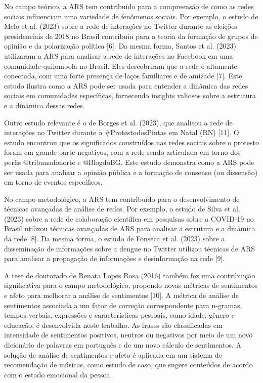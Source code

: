 No campo teórico, a ARS tem contribuído para a compreensão de como as redes sociais influenciam uma variedade de fenômenos sociais. Por exemplo, o estudo de Melo et al. (2023) sobre a rede de interações no Twitter durante as eleições presidenciais de 2018 no Brasil contribuiu para a teoria da formação de grupos de opinião e da polarização política [6]. Da mesma forma, Santos et al. (2023) utilizaram a ARS para analisar a rede de interações no Facebook em uma comunidade quilombola no Brasil. Eles descobriram que a rede é altamente conectada, com uma forte presença de laços familiares e de amizade [7]. Este estudo ilustra como a ARS pode ser usada para entender a dinâmica das redes sociais em comunidades específicas, fornecendo insights valiosos sobre a estrutura e a dinâmica dessas redes.

Outro estudo relevante é o de Borges et al. (2023), que analisou a rede de interações no Twitter durante o \#ProtestodosPintas em Natal (RN) [11]. O estudo encontrou que os significados construídos nas redes sociais sobre o protesto foram em grande parte negativos, com a rede sendo articulada em torno dos perfis @tribunadonorte e @BlogdoBG. Este estudo demonstra como a ARS pode ser usada para analisar a opinião pública e a formação de consenso (ou dissensão) em torno de eventos específicos.

No campo metodológico, a ARS tem contribuído para o desenvolvimento de técnicas avançadas de análise de redes. Por exemplo, o estudo de Silva et al. (2023) sobre a rede de colaboração científica em pesquisas sobre a COVID-19 no Brasil utilizou técnicas avançadas de ARS para analisar a estrutura e a dinâmica da rede [8]. Da mesma forma, o estudo de Fonseca et al. (2023) sobre a disseminação de informações sobre a dengue no Twitter utilizou técnicas de ARS para analisar a propagação de informações e desinformação na rede [9].

A tese de doutorado de Renata Lopes Rosa (2016) também fez uma contribuição significativa para o campo metodológico, propondo novas métricas de sentimentos e afeto para melhorar a análise de sentimentos [10]. A métrica de análise de sentimentos associada a um fator de correção correspondente para n-gramas, tempos verbais, expressões e características pessoais, como idade, gênero e educação, é desenvolvida neste trabalho. As frases são classificadas em intensidade de sentimentos positivos, neutros ou negativos por meio de um novo dicionário de palavras em português e de um novo cálculo de sentimentos. A solução de análise de sentimentos e afeto é aplicada em um sistema de recomendação de músicas, como estudo de caso, que sugere conteúdos de acordo com o estado emocional da pessoa.

